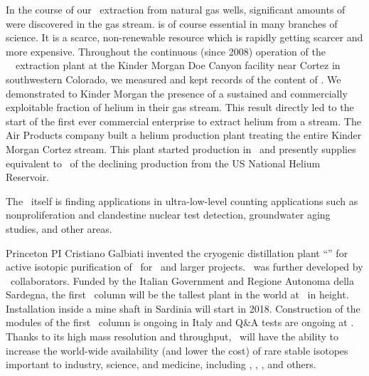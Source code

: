 \begin{compactitem}

\item In the course of our \UAr\ extraction from natural gas wells, significant amounts of  were discovered in the gas stream.   is of course essential in many branches of science. It is a scarce, non-renewable resource which is rapidly getting scarcer and more expensive.  Throughout the continuous (since 2008) operation of the  \DSfs\ \UAr\ extraction plant at the Kinder Morgan Doe Canyon  facility near Cortez in southwestern Colorado, we measured and kept records of the content of .  We demonstrated to Kinder Morgan the presence of a sustained and commercially exploitable fraction of helium in their gas stream.  This result directly led to the start of the first ever commercial enterprise to extract helium from a  stream.  The Air Products company built a helium production plant treating the entire Kinder Morgan Cortez  stream.  This plant started production in \UraniaHeStartDate\ and presently supplies  equivalent to \UraniaHeNationalReserveFractionEquivalentRate\ of the declining production from the US National Helium Reservoir.

\item The \UAr\ itself is finding applications in ultra-low-level counting applications such as nonproliferation and clandestine nuclear test detection, groundwater aging studies, and other areas.

\item Princeton PI Cristiano Galbiati invented the cryogenic distillation plant ``\Aria'' for active isotopic purification of \UAr\ for \DSks\ and larger projects.  \Aria\ was further developed by \DSfs\ collaborators.  Funded by the Italian Government and Regione Autonoma della Sardegna, the first \Aria\ column will be the tallest plant in the world at \AriaSeruciHeight\ in height.  Installation inside a mine shaft in Sardinia will start in 2018.  Construction of the modules of the first \Aria\ column is ongoing in Italy and Q\&A tests are ongoing at \CERN.  Thanks to its high mass resolution and throughput, \Aria\ will have the ability to increase the world-wide availability (and lower the cost) of rare stable isotopes important to industry, science, and medicine, including , , , and others.


\end{compactitem}
